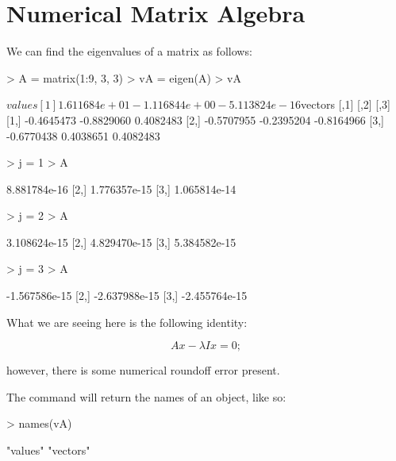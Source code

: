 \documentclass[11pt, oneside, reqno]{article}
\begin{document}
\section{Numerical Matrix Algebra}
We can find the eigenvalues of a matrix as follows:
\begin{Schunk}
\begin{Sinput}
> A = matrix(1:9, 3, 3)
> vA = eigen(A)
> vA
\end{Sinput}
\begin{Soutput}
$values
[1]  1.611684e+01 -1.116844e+00 -5.113824e-16

$vectors
           [,1]       [,2]       [,3]
[1,] -0.4645473 -0.8829060  0.4082483
[2,] -0.5707955 -0.2395204 -0.8164966
[3,] -0.6770438  0.4038651  0.4082483
\end{Soutput}
\begin{Sinput}
> j = 1
> A %
\end{Sinput}
\begin{Soutput}
             [,1]
[1,] 8.881784e-16
[2,] 1.776357e-15
[3,] 1.065814e-14
\end{Soutput}
\begin{Sinput}
> j = 2
> A %
\end{Sinput}
\begin{Soutput}
             [,1]
[1,] 3.108624e-15
[2,] 4.829470e-15
[3,] 5.384582e-15
\end{Soutput}
\begin{Sinput}
> j = 3
> A %
\end{Sinput}
\begin{Soutput}
              [,1]
[1,] -1.567586e-15
[2,] -2.637988e-15
[3,] -2.455764e-15
\end{Soutput}
\end{Schunk}

What we are seeing here is the following identity:

\[
Ax - \lambda I x = 0;
\]

however, there is some numerical roundoff error present. 
\eans

The \verb@names@ command will return the names of an object, like so:

\begin{Schunk}
\begin{Sinput}
> names(vA)
\end{Sinput}
\begin{Soutput}
[1] "values"  "vectors"
\end{Soutput}
\end{Schunk}
\end{document}
